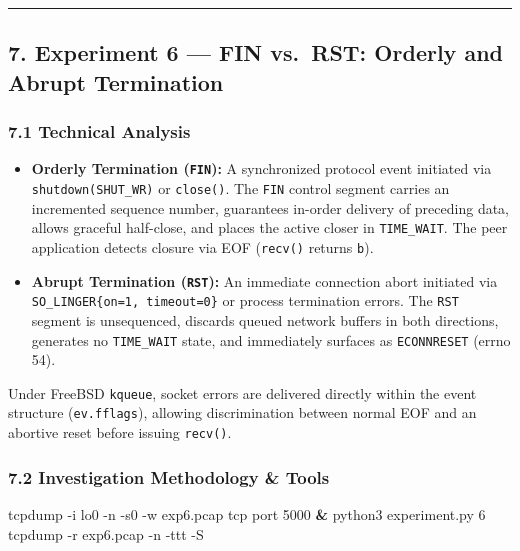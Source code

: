 \documentclass[
]{article}
\newenvironment{Shaded}{\begin{snugshade}}{\end{snugshade}}
\newcommand{\AttributeTok}[1]{\textcolor[rgb]{0.13,0.29,0.53}{#1}}
\newcommand{\ExtensionTok}[1]{#1}
\newcommand{\KeywordTok}[1]{\textcolor[rgb]{0.13,0.29,0.53}{\textbf{#1}}}
\newcommand{\NormalTok}[1]{#1}
\newcommand{\StringTok}[1]{\textcolor[rgb]{0.31,0.60,0.02}{#1}}
\providecommand{\tightlist}{%
  \setlength{\itemsep}{0pt}\setlength{\parskip}{0pt}}
\begin{document}
\begin{center}\rule{0.5\linewidth}{0.5pt}\end{center}

\hypertarget{experiment-6-fin-vs.-rst-orderly-and-abrupt-termination}{%
\subsection{7. Experiment 6 --- FIN vs.~RST: Orderly and Abrupt
Termination}\label{experiment-6-fin-vs.-rst-orderly-and-abrupt-termination}}

\hypertarget{technical-analysis-5}{%
\subsubsection{7.1 Technical Analysis}\label{technical-analysis-5}}

\begin{itemize}
\tightlist
\item
  \textbf{Orderly Termination (\texttt{FIN}):} A synchronized protocol
  event initiated via \texttt{shutdown(SHUT\_WR)} or \texttt{close()}.
  The \texttt{FIN} control segment carries an incremented sequence
  number, guarantees in-order delivery of preceding data, allows
  graceful half-close, and places the active closer in
  \texttt{TIME\_WAIT}. The peer application detects closure via EOF
  (\texttt{recv()} returns
  \texttt{b\textquotesingle{}\textquotesingle{}}).
\item
  \textbf{Abrupt Termination (\texttt{RST}):} An immediate connection
  abort initiated via \texttt{SO\_LINGER\{on=1,\ timeout=0\}} or process
  termination errors. The \texttt{RST} segment is unsequenced, discards
  queued network buffers in both directions, generates no
  \texttt{TIME\_WAIT} state, and immediately surfaces as
  \texttt{ECONNRESET} (errno 54).
\end{itemize}

Under FreeBSD \texttt{kqueue}, socket errors are delivered directly
within the event structure (\texttt{ev.fflags}), allowing discrimination
between normal EOF and an abortive reset before issuing \texttt{recv()}.

\hypertarget{investigation-methodology-tools-4}{%
\subsubsection{7.2 Investigation Methodology \&
Tools}\label{investigation-methodology-tools-4}}

\begin{Shaded}
\begin{Highlighting}[]
\ExtensionTok{tcpdump} \AttributeTok{{-}i}\NormalTok{ lo0 }\AttributeTok{{-}n} \AttributeTok{{-}s0} \AttributeTok{{-}w}\NormalTok{ exp6.pcap }\StringTok{\textquotesingle{}tcp port 5000\textquotesingle{}} \KeywordTok{\&}
\ExtensionTok{python3}\NormalTok{ experiment.py 6}
\ExtensionTok{tcpdump} \AttributeTok{{-}r}\NormalTok{ exp6.pcap }\AttributeTok{{-}n} \AttributeTok{{-}ttt} \AttributeTok{{-}S}
\end{Highlighting}
\end{Shaded}
\end{document}
